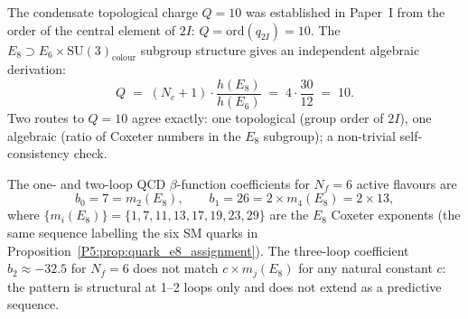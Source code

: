 \begin{remark}
\label{P5:rem:Q_double_derivation}
The condensate topological charge $Q=10$ was established in Paper~I
from the order of the central element of $2I$: $Q=\mathrm{ord}(q_{2I})=10$.
The $E_8\supset E_6\times\mathrm{SU}(3)_{\mathrm{colour}}$ subgroup
structure gives an independent algebraic derivation:
\begin{equation}
  Q \;=\; (N_c+1)\cdot\frac{h(E_8)}{h(E_6)} \;=\; 4\cdot\frac{30}{12} \;=\; 10.
  \label{P5:eq:Q_e8_derivation}
\end{equation}
Two routes to $Q=10$ agree exactly: one topological (group order of
$2I$), one algebraic (ratio of Coxeter numbers in the $E_8$ subgroup);
a non-trivial self-consistency check.
\end{remark}

\begin{remark}
\label{P5:rem:beta_coxeter}
The one- and two-loop QCD $\beta$-function coefficients for $N_f=6$
active flavours are
\begin{equation}
  b_0 = 7 = m_2(E_8), \qquad
  b_1 = 26 = 2\times m_4(E_8) = 2\times13,
\end{equation}
where $\{m_i(E_8)\}=\{1,7,11,13,17,19,23,29\}$ are the $E_8$ Coxeter
exponents (the same sequence labelling the six SM quarks in
Proposition~\ref{P5:prop:quark_e8_assignment}). The three-loop coefficient
$b_2\approx-32.5$ for $N_f=6$ does not match $c\times m_j(E_8)$ for any
natural constant $c$: the pattern is structural at 1--2 loops only and
does not extend as a predictive sequence.
\end{remark}

